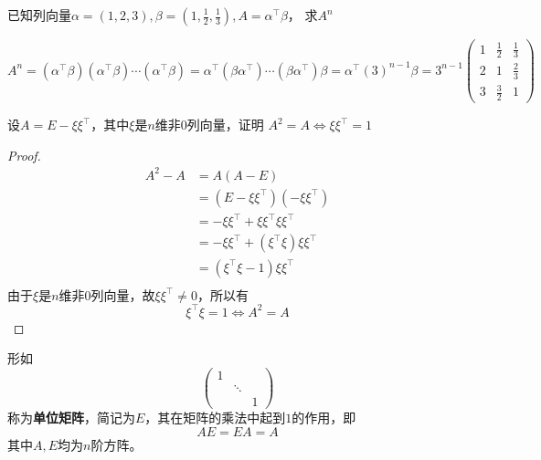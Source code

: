 \begin{example}
    已知列向量$\alpha = (1,2,3),\beta=(1,\frac{1}{2},\frac{1}{3}),A=\alpha^\intercal\beta$，
    求$A^n$
\end{example}
\begin{solution}
    \[
        A^n = (\alpha^\intercal\beta)(\alpha^\intercal\beta)\cdots(\alpha^\intercal\beta)
        =\alpha^\intercal(\beta\alpha^\intercal)\cdots(\beta\alpha^\intercal)\beta
        =\alpha^\intercal(3)^{n-1}\beta
        =3^{n-1}
        \begin{pmatrix}
            1 & \frac{1}{2} & \frac{1}{3} \\
            2 & 1           & \frac{2}{3} \\
            3 & \frac{3}{2} & 1
        \end{pmatrix}
    \]
\end{solution}

\begin{example}
    设$A=E-\xi\xi^\intercal$，其中$\xi$是$n$维非$0$列向量，证明
    $A^2=A\iff \xi\xi^\intercal = 1$
\end{example}
\begin{proof}
    \begin{align*}
        A^2-A & = A(A-E)                                                 \\
              & = (E-\xi\xi^\intercal)(-\xi\xi^\intercal)                \\
              & = -\xi\xi^\intercal + \xi\xi^\intercal\xi\xi^\intercal   \\
              & = -\xi\xi^\intercal + (\xi^\intercal\xi)\xi\xi^\intercal \\
              & = (\xi^\intercal\xi-1)\xi\xi^\intercal                   \\
    \end{align*}
    由于$\xi$是$n$维非$0$列向量，故$\xi\xi^\intercal\neq 0$，所以有
    \[\xi^\intercal\xi = 1 \iff A^2 = A \]
\end{proof}

形如
\[
    \begin{pmatrix}
        1 &        &   \\
          & \ddots &   \\
          &        & 1
    \end{pmatrix}
\]
称为\textbf{\textsf{单位矩阵}}，简记为$E$，其在矩阵的乘法中起到$1$的作用，即
\[ AE = EA = A \]
其中$A,E$均为$n$阶方阵。

